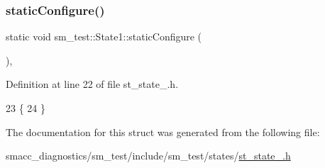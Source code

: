 \subsubsection{\texorpdfstring{static\+Configure()}{staticConfigure()}}
{\footnotesize\ttfamily static void sm\+\_\+test\+::\+State1\+::static\+Configure (\begin{DoxyParamCaption}{ }\end{DoxyParamCaption})\hspace{0.3cm}{\ttfamily [inline]}, {\ttfamily [static]}}



Definition at line 22 of file st\+\_\+state\+\_.\+h.


\begin{DoxyCode}
23     \{
24     \}
\end{DoxyCode}


The documentation for this struct was generated from the following file\+:\begin{DoxyCompactItemize}
\item 
smacc\+\_\+diagnostics/sm\+\_\+test/include/sm\+\_\+test/states/\hyperlink{smacc__diagnostics_2sm__test_2include_2sm__test_2states_2st__state__1_8h}{st\+\_\+state\+\_.\+h}\end{DoxyCompactItemize}

